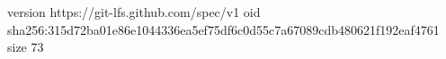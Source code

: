 version https://git-lfs.github.com/spec/v1
oid sha256:315d72ba01e86e1044336ea5ef75df6c0d55c7a67089cdb480621f192eaf4761
size 73
